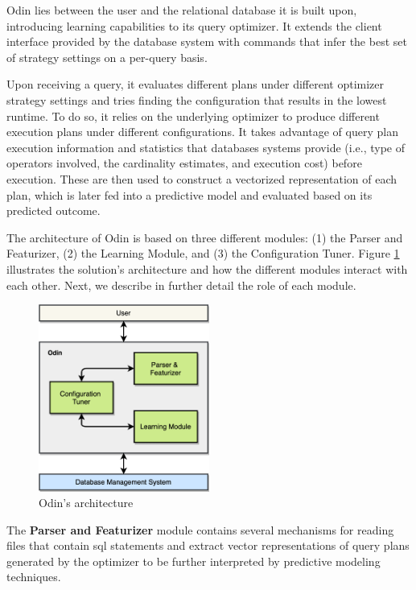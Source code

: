 Odin lies between the user and the relational database it is built upon, introducing learning capabilities to its query optimizer. It extends the client interface provided by the database system with commands that infer the best set of strategy settings on a per-query basis.

Upon receiving a query, it evaluates different plans under different optimizer strategy settings and tries finding the configuration that results in the lowest runtime. To do so, it relies on the underlying optimizer to produce different execution plans under different configurations. It takes advantage of query plan execution information and statistics that databases systems provide (i.e., type of operators involved, the cardinality estimates, and execution cost) before execution. These are then used to construct a vectorized representation of each plan, which is later fed into a predictive model and evaluated based on its predicted outcome.

The architecture of Odin is based on three different modules: (1) the Parser and Featurizer, (2) the Learning Module, and (3) the Configuration Tuner. Figure \ref{fig:architecture} illustrates the solution's architecture and how the different modules interact with each other. Next, we describe in further detail the role of each module.

\begin{figure}[H]
\centering
\includegraphics[width=0.5\textwidth]{img/solution/architecture.png}
\caption{Odin's architecture}
\label{fig:architecture}
\end{figure}

The \textbf{Parser and Featurizer} module contains several mechanisms for reading files that contain \gls{sql} statements and extract vector representations of query plans generated by the optimizer to be further interpreted by predictive modeling techniques.

